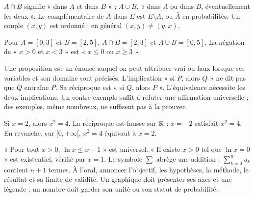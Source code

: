 $A\cap B$ signifie « dans $A$ et dans $B$ » ; $A\cup B$, « dans $A$ ou dans $B$, éventuellement les deux ».
Le complémentaire de $A$ dans $E$ est $E\setminus A$, ou $\bar A$ en probabilités.
Un couple $(x,y)$ est ordonné : en général $(x,y)\ne(y,x)$.
\begin{exemple}
Pour $A=[0,3]$ et $B=[2,5]$, $A\cap B=[2,3]$ et $A\cup B=[0,5]$.
La négation de « $x>0$ et $x<3$ » est « $x\leq0$ ou $x\geq3$ ».
\end{exemple}
Une proposition est un énoncé auquel on peut attribuer vrai ou faux lorsque ses variables et son domaine sont précisés.
L'implication « si $P$, alors $Q$ » ne dit pas que $Q$ entraîne $P$. Sa réciproque est « si $Q$, alors $P$ ».
L'équivalence nécessite les deux implications.
Un contre-exemple suffit à réfuter une affirmation universelle ; des exemples, même nombreux, ne suffisent pas à la prouver.
\begin{exemple}
Si $x=2$, alors $x^2=4$. La réciproque est fausse sur $\mathbb{R}$ : $x=-2$ satisfait $x^2=4$.
En revanche, sur $[0,+\infty[$, $x^2=4$ équivaut à $x=2$.
\end{exemple}
« Pour tout $x>0$, $\ln x\leq x-1$ » est universel. « Il existe $x>0$ tel que $\ln x=0$ » est existentiel, vérifié par $x=1$.
Le symbole $\sum$ abrège une addition : $\sum_{k=0}^{n}u_k$ contient $n+1$ termes.
À l'oral, annoncer l'objectif, les hypothèses, la méthode, le résultat et sa limite de validité. Un graphique doit présenter ses axes et une légende ; un nombre doit garder son unité ou son statut de probabilité.

